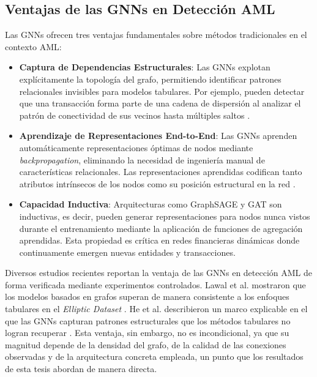 \subsection{Ventajas de las GNNs en Detección AML}

Las GNNs ofrecen tres ventajas fundamentales sobre métodos tradicionales en el contexto AML:

\begin{itemize}
    \item \textbf{Captura de Dependencias Estructurales}: Las GNNs explotan explícitamente la topología del grafo, permitiendo identificar patrones relacionales invisibles para modelos tabulares. Por ejemplo, pueden detectar que una transacción forma parte de una cadena de dispersión al analizar el patrón de conectividad de sus vecinos hasta múltiples saltos \cite{Weber2019Anti-MoneyForensics, Lawal2025AnDataset}.
    \item \textbf{Aprendizaje de Representaciones End-to-End}: Las GNNs aprenden automáticamente representaciones óptimas de nodos mediante \textit{backpropagation}, eliminando la necesidad de ingeniería manual de características relacionales. Las representaciones aprendidas codifican tanto atributos intrínsecos de los nodos como su posición estructural en la red \cite{Du2017TopologyNetworks, He2026AnDetection}.
    \item \textbf{Capacidad Inductiva}: Arquitecturas como GraphSAGE y GAT son inductivas, es decir, pueden generar representaciones para nodos nunca vistos durante el entrenamiento mediante la aplicación de funciones de agregación aprendidas. Esta propiedad es crítica en redes financieras dinámicas donde continuamente emergen nuevas entidades y transacciones.
\end{itemize}

Diversos estudios recientes reportan la ventaja de las GNNs en detección AML de forma verificada mediante experimentos controlados. Lawal et al. mostraron que los modelos basados en grafos superan de manera consistente a los enfoques tabulares en el \textit{Elliptic Dataset} \cite{Lawal2025AnDataset}. He et al. describieron un marco explicable en el que las GNNs capturan patrones estructurales que los métodos tabulares no logran recuperar \cite{He2026AnDetection}. Esta ventaja, sin embargo, no es incondicional, ya que su magnitud depende de la densidad del grafo, de la calidad de las conexiones observadas y de la arquitectura concreta empleada, un punto que los resultados de esta tesis abordan de manera directa.

